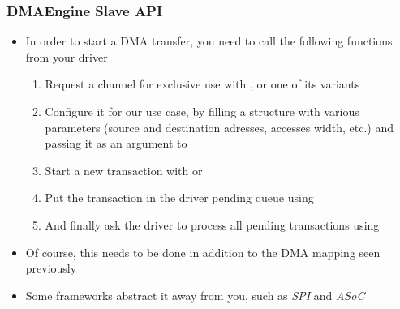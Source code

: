 \begin{frame}
  \frametitle{DMAEngine Slave API}
  \begin{itemize}
  \item In order to start a DMA transfer, you need to call the
    following functions from your driver
    \begin{enumerate}
    \item Request a channel for exclusive use with
      , or one of its variants
    \item Configure it for our use case, by filling a
       structure with various parameters
      (source and destination adresses, accesses width, etc.) and
      passing it as an argument to 
    \item Start a new transaction with
       or
    \item Put the transaction in the driver pending queue using
    \item And finally ask the driver to process all pending
      transactions using 
    \end{enumerate}
  \item Of course, this needs to be done in addition to the DMA
    mapping seen previously
  \item Some frameworks abstract it away from you, such as {\em SPI}
    and {\em ASoC}
  \end{itemize}
\end{frame}
